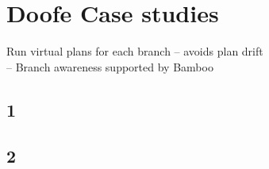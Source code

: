 \documentclass[a4paper,12pt]{article}%
\begin{document}
\section{Doofe Case studies}
Run virtual plans for each branch – avoids plan drift\\
– Branch awareness supported by Bamboo

\subsection{1}
\subsection{2}
\end{document}
